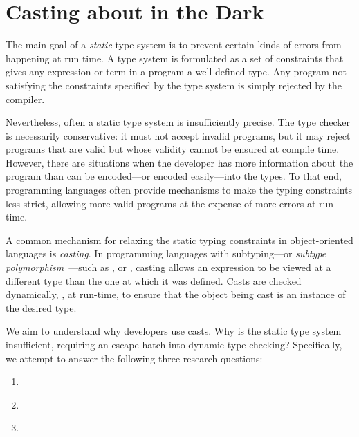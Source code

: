 \chapter{Casting about in the Dark}\label{cha:casts}

The main goal of a \emph{static} type system
is to prevent certain kinds of errors from happening at run time.
A type system is formulated as a set of constraints that gives any expression or term in a program a well-defined type.
Any program not satisfying the constraints specified by the type system is
simply rejected by the compiler.

Nevertheless, often a static type system is insufficiently precise.
The type checker is necessarily conservative:
it must not accept invalid programs,
but it may reject programs that are valid but whose validity cannot be ensured at compile time.
However, there are situations when the developer has more information
about the program than can be encoded---or encoded easily---into the types.
To that end, programming languages often provide mechanisms to make the typing constraints less strict,
allowing more valid programs at the expense of more errors at run time.

A common mechanism for relaxing the static typing constraints in object-oriented languages is \emph{casting}.
In programming languages with subtyping---or \emph{subtype polymorphism}~\citep{cardelliUnderstandingTypesData1985}---such as \java{}, \csharp{} or \cpp{},
casting allows an expression to be viewed at a different type than the one at which it was defined.
Casts are checked dynamically, \ie, at run-time, to ensure that the object
being cast is an instance of the desired type.

We aim to understand why developers use casts.
Why is the static type system insufficient,
requiring an escape hatch into dynamic type checking?
Specifically, we attempt to answer the following three research questions:

\begin{enumerate}[label=RQ/C\arabic*:,ref=RQ/C\arabic*,leftmargin=3.4\parindent]
\item\label{casts:rq1}{\bf \crqA} \crqAdesc{}
\item\label{casts:rq2}{\bf \crqB} \crqBdesc{}
\item\label{casts:rq3}{\bf \crqC} \crqCdesc{}
\end{enumerate}

